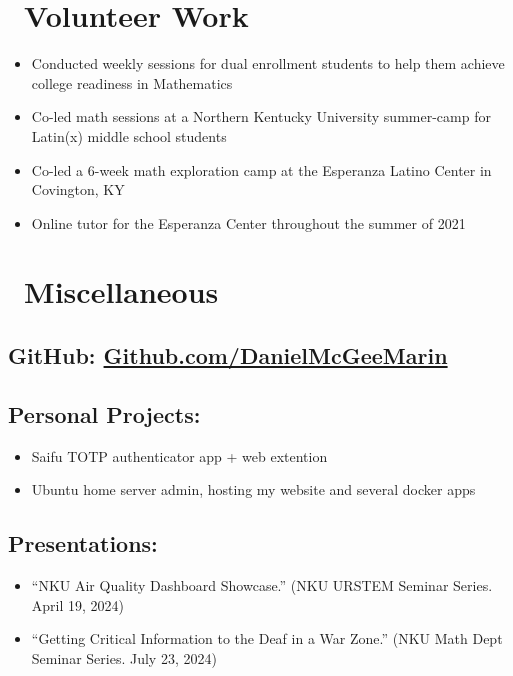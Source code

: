 \documentclass{resume}
\begin{document}
\section{\faHeartO\ Volunteer Work}
\begin{itemize}[parsep=0.5ex]
    \item Conducted weekly sessions for dual enrollment students to help them achieve college readiness in Mathematics
\end{itemize}
\begin{itemize}[parsep=0.5ex]
    \item Co-led math sessions at a Northern Kentucky University summer-camp for Latin(x) middle school students
\end{itemize}
\begin{itemize}[parsep=0.5ex]
    \item Co-led a 6-week math exploration camp at the Esperanza Latino Center in Covington, KY
    \item Online tutor for the Esperanza Center throughout the summer of 2021
\end{itemize}


\section{\faInfo\ Miscellaneous}
\subsection{GitHub: \href{https://github.com/DanielMcGeeMarin}{Github.com/DanielMcGeeMarin}}
\subsection{Personal Projects:}
\begin{itemize}[parsep=0.5ex]
  \item Saifu TOTP authenticator app + web extention
  \item Ubuntu home server admin, hosting my website and several docker apps
\end{itemize}
\subsection{Presentations:}
\begin{itemize}[parsep=0.5ex]
  \item “NKU Air Quality Dashboard Showcase.” (NKU URSTEM Seminar Series. April 19, 2024)
  \item “Getting Critical Information to the Deaf in a War Zone.” (NKU Math Dept Seminar Series. July 23, 2024)
\end{itemize}


%
%
\end{document}
